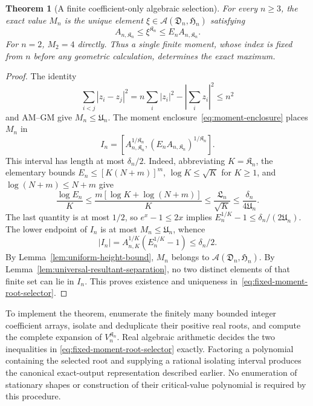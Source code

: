\documentclass[11pt]{article}
\newtheorem{theorem}{Theorem}[section]
\theoremstyle{remark}
\numberwithin{equation}{section}
\begin{document}
\begin{theorem}[A finite coefficient-only algebraic selection]
\label{thm:fixed-moment-reconstruction}
For every $n\ge3$, the exact value $M_n$ is the unique element
$\xi\in\mathcal A(\mathfrak{D}_n,\mathfrak{H}_n)$ satisfying
\begin{equation}\label{eq:fixed-moment-root-selector}
 \boxed{\qquad A_{n,\mathfrak{K}_n}\le\xi^{\mathfrak{K}_n}\le E_nA_{n,\mathfrak{K}_n}.\qquad}
\end{equation}
For $n=2$, $M_2=4$ directly.
Thus a single finite moment, whose index is fixed from $n$ before any
geometric calculation, determines the exact maximum.
\end{theorem}
\begin{proof}
The identity
\[
 \sum_{i<j}|z_i-z_j|^2
 =n\sum_i|z_i|^2-\left|\sum_i z_i\right|^2\le n^2
\]
and AM--GM give $M_n\le \mathfrak{U}_n$.
The moment enclosure~\eqref{eq:moment-enclosure} places $M_n$ in
\[
 I_n=[A_{n,\mathfrak{K}_n}^{1/\mathfrak{K}_n},(E_nA_{n,\mathfrak{K}_n})^{1/\mathfrak{K}_n}].
\]
This interval has length at most $\delta_n/2$. Indeed, abbreviating
$K=\mathfrak{K}_n$, the elementary bounds
$E_n\le[K(N+m)]^m$, $\log K\le\sqrt K$ for $K\ge1$, and
$\log(N+m)\le N+m$ give
\[
 \frac{\log E_n}{K}
 \le\frac{m[\log K+\log(N+m)]}{K}
 \le\frac{\mathfrak{L}_n}{\sqrt K}\le\frac{\delta_n}{4\mathfrak{U}_n}.
\]
The last quantity is at most $1/2$, so $e^x-1\le2x$ implies
$E_n^{1/K}-1\le\delta_n/(2\mathfrak{U}_n)$. The lower endpoint of $I_n$
is at most $M_n\le \mathfrak{U}_n$, whence
\[
 |I_n|=A_{n,K}^{1/K}(E_n^{1/K}-1)\le\delta_n/2.
\]
By Lemma~\ref{lem:uniform-height-bound}, $M_n$ belongs to
$\mathcal A(\mathfrak{D}_n,\mathfrak{H}_n)$. By
Lemma~\ref{lem:universal-resultant-separation}, no two distinct
elements of that finite set can lie in $I_n$. This proves existence
and uniqueness in~\eqref{eq:fixed-moment-root-selector}.
\end{proof}

To implement the theorem, enumerate the finitely many bounded integer
coefficient arrays, isolate and deduplicate their positive real roots,
and compute the complete expansion of $V_n^{\mathfrak{K}_n}$. Real algebraic
arithmetic decides the two inequalities in
\eqref{eq:fixed-moment-root-selector} exactly. Factoring a polynomial
containing the selected root and supplying a rational isolating
interval produces the canonical exact-output representation described
earlier. No enumeration of stationary shapes or construction of their
critical-value polynomial is required by this procedure.
\end{document}
